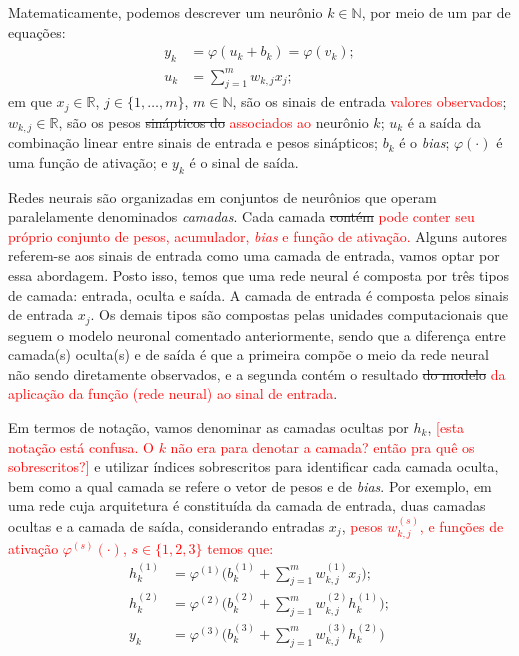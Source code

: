 \documentclass{automatextcc}
\newcommand{\pumi}[1]{\textcolor{red}{#1}}
\newcommand{\R}{\mathds{R}}
\begin{document}
Matematicamente, podemos descrever um neurônio $k \in \mathds{N}$, por meio de um par de equações:
\begin{align*}
    y_k &= \varphi(u_k + b_k) = \varphi(v_k);\\[.2cm]
    u_k &= \displaystyle{\sum_{j=1}^{m} }w_{k,j}x_j;
\end{align*}
em que $x_j \in \R$, $j \in \{1,\dots,m\}$, $m \in \mathds{N}$, são os sinais de entrada \pumi{valores observados}; $w_{k,j} \in \R$, são os pesos \sout{sinápticos do} \pumi{associados ao} neurônio $k$; $u_k$ é a saída da combinação linear entre sinais de entrada e pesos sinápticos; $b_k$ é o \textit{bias}; $\varphi(\cdot)$ é uma função de ativação; e $y_k$ é o sinal de saída.

Redes neurais são organizadas em conjuntos de neurônios que operam paralelamente denominados \textit{camadas}. Cada camada \sout{contém} \pumi{pode conter seu próprio conjunto de pesos, acumulador, \textit{bias} e função de ativação.} Alguns autores referem-se aos sinais de entrada como uma camada de entrada, vamos optar por essa abordagem. Posto isso, temos que uma rede neural é composta por três tipos de camada: entrada, oculta e saída. A camada de entrada é composta pelos sinais de entrada $x_j$. Os demais tipos são compostas pelas unidades computacionais que seguem o modelo neuronal comentado anteriormente, sendo que a diferença entre camada(s) oculta(s) e de saída é que a primeira compõe o meio da rede neural não sendo diretamente observados, e a segunda contém o resultado \sout{do modelo} \pumi{da aplicação da função (rede neural) ao sinal de entrada}.

Em termos de notação, vamos denominar as camadas ocultas por $h_k$, \pumi{[esta notação está confusa. O $k$ não era para denotar a camada? então pra quê os sobrescritos?]} e utilizar índices sobrescritos para identificar cada camada oculta, bem como a qual camada se refere o vetor de pesos e de \textit{bias}. Por exemplo, em uma rede cuja arquitetura é constituída da camada de entrada, duas camadas ocultas e a camada de saída, considerando entradas $x_j$, \pumi{pesos $w_{k,j}^{(s)}$, e funções de ativação $\varphi^{(s)}(\cdot)$, $s\in\{1,2,3\}$ temos que:}
\begin{align*}
    h_k^{(1)} &= \varphi^{(1)} \biggl(b_k^{(1)} + \displaystyle{\sum_{j=1}^{m} }w_{k,j}^{(1)}x_j \biggl);\\[.2cm]
    h_k^{(2)} &= \varphi^{(2)} \biggl(b_k^{(2)} + \displaystyle{\sum_{j=1}^{m} }w_{k,j}^{(2)}h_k^{(1)} \biggl);\\[.2cm]
    y_k &= \varphi^{(3)} \biggl(b_k^{(3)} + \displaystyle{\sum_{j=1}^{m} }w_{k,j}^{(3)}h_k^{(2)} \biggl)
\end{align*}
\end{document}
